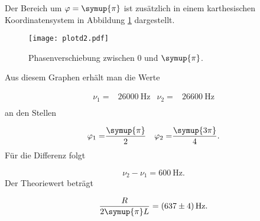 Der Bereich um $\varphi = \symup{\pi}$ ist zusätzlich in einem karthesischen
Koordinatensystem in Abbildung \ref{fig:Karth} dargestellt.

\newpage

\begin{figure}
  \centering
  \texttt{[image: plotd2.pdf]}
  \caption{Phasenverschiebung zwischen $0$ und $\symup{\pi}$.}
  \label{fig:Karth}
\end{figure}

Aus diesem Graphen erhält man die Werte

\begin{align}
  \nu_1 = & \SI{26000}{\hertz} & \nu_2 = & \SI{26600}{\hertz} \\
\end{align}
an den Stellen

\begin{align}
  \varphi_1 = & \frac{\symup{\pi}}{2} & \varphi_2 = & \frac{\symup{3\pi}}{4}. \\
\end{align}
Für die Differenz folgt

\begin{equation}
  \nu_2 - \nu_1 = \SI{600}{\hertz}.
\end{equation}
Der Theoriewert beträgt

\begin{equation}
  \frac{R}{2\symup{\pi}L} = \SI{637(4)}{\hertz}.
\end{equation}
